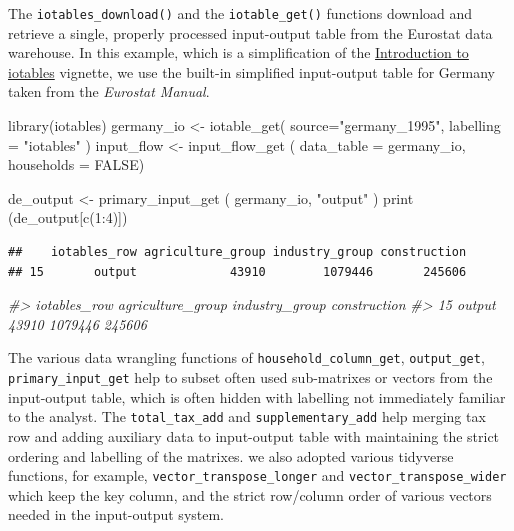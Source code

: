 \documentclass[
]{article}
\newenvironment{Shaded}{\begin{snugshade}}{\end{snugshade}}
\newcommand{\AttributeTok}[1]{\textcolor[rgb]{0.77,0.63,0.00}{#1}}
\newcommand{\CommentTok}[1]{\textcolor[rgb]{0.56,0.35,0.01}{\textit{#1}}}
\newcommand{\ConstantTok}[1]{\textcolor[rgb]{0.00,0.00,0.00}{#1}}
\newcommand{\DecValTok}[1]{\textcolor[rgb]{0.00,0.00,0.81}{#1}}
\newcommand{\FunctionTok}[1]{\textcolor[rgb]{0.00,0.00,0.00}{#1}}
\newcommand{\NormalTok}[1]{#1}
\newcommand{\OtherTok}[1]{\textcolor[rgb]{0.56,0.35,0.01}{#1}}
\newcommand{\SpecialCharTok}[1]{\textcolor[rgb]{0.00,0.00,0.00}{#1}}
\newcommand{\StringTok}[1]{\textcolor[rgb]{0.31,0.60,0.02}{#1}}
\begin{document}
The \texttt{iotables\_download()} and the \texttt{iotable\_get()}
functions download and retrieve a single, properly processed
input-output table from the Eurostat data warehouse. In this example,
which is a simplification of the
\href{https://iotables.dataobservatory.eu/articles/intro.html}{Introduction
to iotables} vignette, we use the built-in simplified input-output table
for Germany taken from the \emph{Eurostat Manual}.

\begin{Shaded}
\begin{Highlighting}[]
\FunctionTok{library}\NormalTok{(iotables)}
\NormalTok{germany\_io }\OtherTok{\textless{}{-}} \FunctionTok{iotable\_get}\NormalTok{( }\AttributeTok{source=}\StringTok{"germany\_1995"}\NormalTok{, }\AttributeTok{labelling =} \StringTok{"iotables"}\NormalTok{ )}
\NormalTok{input\_flow }\OtherTok{\textless{}{-}} \FunctionTok{input\_flow\_get}\NormalTok{ ( }
                  \AttributeTok{data\_table =}\NormalTok{ germany\_io, }
                  \AttributeTok{households =} \ConstantTok{FALSE}\NormalTok{)}

\NormalTok{de\_output }\OtherTok{\textless{}{-}} \FunctionTok{primary\_input\_get}\NormalTok{ ( germany\_io, }\StringTok{"output"}\NormalTok{ )}
\FunctionTok{print}\NormalTok{ (de\_output[}\FunctionTok{c}\NormalTok{(}\DecValTok{1}\SpecialCharTok{:}\DecValTok{4}\NormalTok{)])}
\end{Highlighting}
\end{Shaded}

\begin{verbatim}
##    iotables_row agriculture_group industry_group construction
## 15       output             43910        1079446       245606
\end{verbatim}

\begin{Shaded}
\begin{Highlighting}[]
\CommentTok{\#\textgreater{}    iotables\_row agriculture\_group industry\_group construction}
\CommentTok{\#\textgreater{} 15       output             43910        1079446       245606}
\end{Highlighting}
\end{Shaded}

The various data wrangling functions of \texttt{household\_column\_get},
\texttt{output\_get}, \texttt{primary\_input\_get} help to subset often
used sub-matrixes or vectors from the input-output table, which is often
hidden with labelling not immediately familiar to the analyst. The
\texttt{total\_tax\_add} and \texttt{supplementary\_add} help merging
tax row and adding auxiliary data to input-output table with maintaining
the strict ordering and labelling of the matrixes. we also adopted
various tidyverse functions, for example,
\texttt{vector\_transpose\_longer} and \texttt{vector\_transpose\_wider}
which keep the key column, and the strict row/column order of various
vectors needed in the input-output system.
\end{document}
